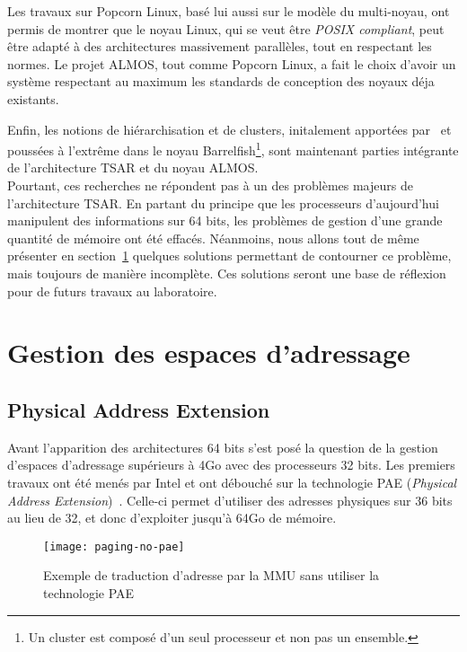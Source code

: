       Les travaux sur Popcorn Linux, basé lui aussi sur le modèle du
      multi-noyau, ont permis de montrer que le noyau Linux, qui se veut être
      \textit{POSIX compliant}, peut être adapté à des architectures massivement
      parallèles, tout en respectant les normes. Le projet ALMOS, tout comme
      Popcorn Linux, a fait le choix d'avoir un système respectant au maximum
      les standards de conception des noyaux déja existants.

      Enfin, les notions de hiérarchisation et de clusters, initalement
      apportées par~\citet{unrau1995hierarchical} et poussées à l'extrême dans
      le noyau Barrelfish\footnote{Un cluster est composé d'un seul processeur
        et non pas un ensemble.}, sont maintenant parties intégrante de
      l'architecture TSAR et du noyau ALMOS.\\

      Pourtant, ces recherches ne répondent pas à un des problèmes majeurs de
      l'architecture TSAR. En partant du principe que les processeurs
      d'aujourd'hui manipulent des informations sur 64 bits, les problèmes de
      gestion d'une grande quantité de mémoire ont été effacés. Néanmoins, nous
      allons tout de même présenter en section~\ref{sec:memory} quelques
      solutions permettant de contourner ce problème, mais toujours de manière
      incomplète. Ces solutions seront une base de réflexion pour de futurs
      travaux au laboratoire.
    
     

  \section{Gestion des espaces d'adressage}
  \label{sec:memory}    

    \subsection{Physical Address Extension}

      Avant l'apparition des architectures 64 bits s'est posé la question de la
      gestion d'espaces d'adressage supérieurs à 4Go avec des processeurs 32
      bits. Les premiers travaux ont été menés par Intel et ont débouché sur la
      technologie PAE (\textit{Physical Address
        Extension})~\citep{patent6349380}. Celle-ci permet d'utiliser des
      adresses physiques sur 36 bits au lieu de 32, et donc d'exploiter jusqu'à
      64Go de mémoire.

      \begin{figure}[h]
        \centering \texttt{[image: paging-no-pae]}
        \caption{Exemple de traduction d'adresse par la MMU sans utiliser la
          technologie PAE}
        \label{fig:paging-no-pae}
        \end{figure}
      

